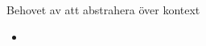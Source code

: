 


 

\begin{Slide}{\TODO Behovet av att abstrahera över kontext}\SlideFontSmall
\begin{itemize}\SlideFontTiny
\item \TODO
\end{itemize}
\end{Slide}








